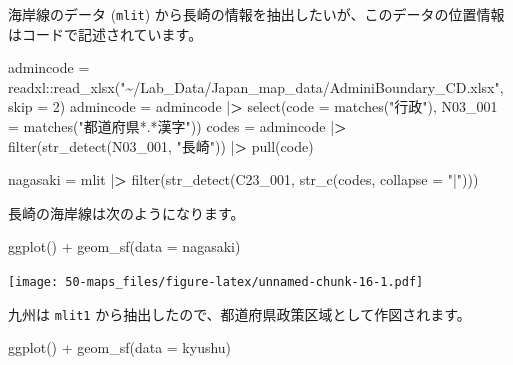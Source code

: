 \documentclass[
]{book}
\newenvironment{Shaded}{\begin{snugshade}}{\end{snugshade}}
\newcommand{\AttributeTok}[1]{\textcolor[rgb]{0.77,0.63,0.00}{#1}}
\newcommand{\DecValTok}[1]{\textcolor[rgb]{0.00,0.00,0.81}{#1}}
\newcommand{\ErrorTok}[1]{\textcolor[rgb]{0.64,0.00,0.00}{\textbf{#1}}}
\newcommand{\FunctionTok}[1]{\textcolor[rgb]{0.00,0.00,0.00}{#1}}
\newcommand{\NormalTok}[1]{#1}
\newcommand{\OtherTok}[1]{\textcolor[rgb]{0.56,0.35,0.01}{#1}}
\newcommand{\SpecialCharTok}[1]{\textcolor[rgb]{0.00,0.00,0.00}{#1}}
\newcommand{\StringTok}[1]{\textcolor[rgb]{0.31,0.60,0.02}{#1}}
\theoremstyle{definition}
\theoremstyle{definition}
\theoremstyle{definition}
\theoremstyle{definition}
\theoremstyle{remark}
\begin{document}
海岸線のデータ (\texttt{mlit}) から長崎の情報を抽出したいが、このデータの位置情報はコードで記述されています。

\begin{Shaded}
\begin{Highlighting}[]
\NormalTok{admincode }\OtherTok{=}\NormalTok{ readxl}\SpecialCharTok{::}\FunctionTok{read\_xlsx}\NormalTok{(}\StringTok{"\textasciitilde{}/Lab\_Data/Japan\_map\_data/AdminiBoundary\_CD.xlsx"}\NormalTok{, }\AttributeTok{skip =} \DecValTok{2}\NormalTok{)}
\NormalTok{admincode }\OtherTok{=}\NormalTok{ admincode }\SpecialCharTok{|}\ErrorTok{\textgreater{}} \FunctionTok{select}\NormalTok{(}\AttributeTok{code =} \FunctionTok{matches}\NormalTok{(}\StringTok{"行政"}\NormalTok{), }\AttributeTok{N03\_001 =} \FunctionTok{matches}\NormalTok{(}\StringTok{"都道府県*.*漢字"}\NormalTok{))}
\NormalTok{codes }\OtherTok{=}\NormalTok{ admincode }\SpecialCharTok{|}\ErrorTok{\textgreater{}} \FunctionTok{filter}\NormalTok{(}\FunctionTok{str\_detect}\NormalTok{(N03\_001, }\StringTok{"長崎"}\NormalTok{)) }\SpecialCharTok{|}\ErrorTok{\textgreater{}} \FunctionTok{pull}\NormalTok{(code)}
\end{Highlighting}
\end{Shaded}

\begin{Shaded}
\begin{Highlighting}[]
\NormalTok{nagasaki }\OtherTok{=}\NormalTok{ mlit }\SpecialCharTok{|}\ErrorTok{\textgreater{}} \FunctionTok{filter}\NormalTok{(}\FunctionTok{str\_detect}\NormalTok{(C23\_001, }\FunctionTok{str\_c}\NormalTok{(codes, }\AttributeTok{collapse =} \StringTok{"|"}\NormalTok{))) }
\end{Highlighting}
\end{Shaded}

長崎の海岸線は次のようになります。

\begin{Shaded}
\begin{Highlighting}[]
\FunctionTok{ggplot}\NormalTok{() }\SpecialCharTok{+} \FunctionTok{geom\_sf}\NormalTok{(}\AttributeTok{data =}\NormalTok{ nagasaki)}
\end{Highlighting}
\end{Shaded}

\texttt{[image: 50-maps\_files/figure-latex/unnamed-chunk-16-1.pdf]}

九州は \texttt{mlit1} から抽出したので、都道府県政策区域として作図されます。

\begin{Shaded}
\begin{Highlighting}[]
\FunctionTok{ggplot}\NormalTok{() }\SpecialCharTok{+} \FunctionTok{geom\_sf}\NormalTok{(}\AttributeTok{data =}\NormalTok{ kyushu)}
\end{Highlighting}
\end{Shaded}
\end{document}

